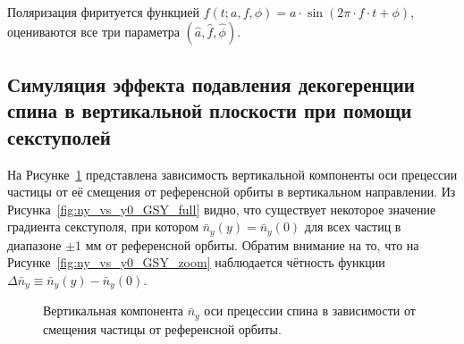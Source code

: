 Поляризация фиритуется функцией $f(t; a,f,\phi) = a\cdot \sin(2\pi\cdot
f\cdot t + \phi)$, оцениваются все три параметра $(\hat a, \hat f,
\hat\phi)$. 

\subsection{Симуляция эффекта подавления декогеренции спина в вертикальной плоскости при помощи секступолей}
На Рисунке~\ref{fig:ny_vs_y0_GSY} представлена зависимость вертикальной компоненты оси прецессии частицы от её смещения от референсной орбиты в вертикальном направлении. Из Рисунка~\ref{fig:ny_vs_y0_GSY_full} видно, что существует некоторое значение градиента секступоля, при котором $\bar n_y(y) = \bar n_y(0)$ для всех частиц в диапазоне $\pm 1$ мм от референсной орбиты. Обратим внимание на то, что на Рисунке~\ref{fig:ny_vs_y0_GSY_zoom} наблюдается чётность функции $\Delta\bar n_y \equiv \bar n_y(y) - \bar n_y(0)$.

\begin{figure}[h!]
	\centering
	\hfill
	\hfill
	\hfill
	\caption{Вертикальная компонента $\bar n_y$ оси прецессии спина в зависимости от смещения частицы от референсной орбиты.\label{fig:ny_vs_y0_GSY}}
\end{figure}

